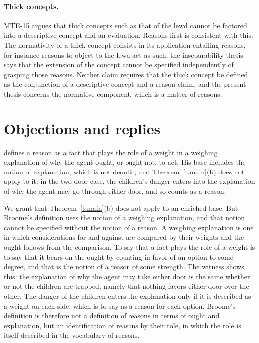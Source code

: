 \documentclass{situationist-preprint}
\begin{document}
\paragraph{Thick concepts.} MTE-15 argues that thick concepts such as that of the lewd cannot be factored into a descriptive concept and an evaluation. Reasons first is consistent with this. The normativity of a thick concept consists in its application entailing reasons, for instance reasons to object to the lewd act as such; the inseparability thesis says that the extension of the concept cannot be specified independently of grasping those reasons. Neither claim requires that the thick concept be defined as the conjunction of a descriptive concept and a reason claim, and the present thesis concerns the normative component, which is a matter of reasons.

\section{Objections and replies}\label{s:objections}

\begin{objection}\label{o:broome}
\citet{Broome2004} defines a reason as a fact that plays the role of a weight in a weighing explanation of why the agent ought, or ought not, to act. His base includes the notion of explanation, which is not deontic, and Theorem~\ref{t:main}(b) does not apply to it: in the two-door case, the children's danger enters into the explanation of why the agent may go through either door, and so counts as a reason.
\end{objection}

\begin{reply}
We grant that Theorem~\ref{t:main}(b) does not apply to an enriched base. But Broome's definition uses the notion of a weighing explanation, and that notion cannot be specified without the notion of a reason. A weighing explanation is one in which considerations for and against are compared by their weights and the ought follows from the comparison. To say that a fact plays the role of a weight is to say that it bears on the ought by counting in favor of an option to some degree, and that is the notion of a reason of some strength. The witness shows this: the explanation of why the agent may take either door is the same whether or not the children are trapped, namely that nothing favors either door over the other. The danger of the children enters the explanation only if it is described as a weight on each side, which is to say as a reason for each option. Broome's definition is therefore not a definition of reasons in terms of ought and explanation, but an identification of reasons by their role, in which the role is itself described in the vocabulary of reasons.
\end{reply}
\end{document}
